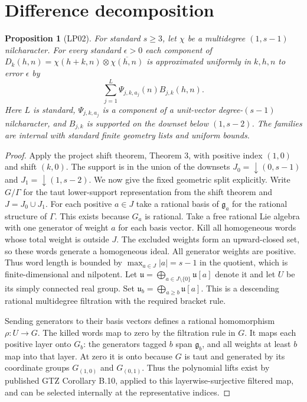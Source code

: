 \documentclass[11pt]{article}
\newtheorem{proposition}{Proposition}
\begin{document}
\section{Difference decomposition}
\begin{proposition}[LP02]
For standard $s\ge3$, let $\chi$ be a multidegree $(1,s-1)$
nilcharacter. For every standard $\epsilon>0$ each component of
$D_k(h,n)=\chi(h+k,n)\otimes\overline{\chi(h,n)}$
is approximated uniformly in $k,h,n$ to error $\epsilon$ by
\[
 \sum_{j=1}^{L} \Psi_{j,k,a_j}(n) B_{j,k}(h,n).
\]
Here $L$ is standard, $\Psi_{j,k,a_j}$ is a component of a
unit-vector degree-$(s-1)$ nilcharacter, and $B_{j,k}$ is supported
on the downset below $(1,s-2)$. The families are internal with
standard finite geometry lists and uniform bounds.
\end{proposition}
\begin{proof}
Apply the project shift theorem, Theorem 3, with positive index
$(1,0)$ and shift $(k,0)$. The support is in the union of the downsets
$J_0=\downarrow(0,s-1)$ and $J_1=\downarrow(1,s-2)$.
We now give the fixed geometric split explicitly. Write $G/\Gamma$
for the taut lower-support representation from the shift theorem and
$J=J_0\cup J_1$. For each positive $a\in J$ take a rational basis of
$\mathfrak g_a$ for the rational structure of $\Gamma$. This exists
because $G_a$ is rational. Take a free rational Lie algebra with one
generator of weight $a$ for each basis vector. Kill all homogeneous
words whose total weight is outside $J$. The excluded weights form
an upward-closed set, so these words generate a homogeneous ideal.
All generator weights are positive. Thus word length is bounded by
$\max_{a\in J}|a|=s-1$ in the quotient, which is finite-dimensional
and nilpotent. Let $\mathfrak u=\bigoplus_{a\in J\setminus\{0\}}
\mathfrak u[a]$ denote it and let $U$ be its simply connected real
group. Set $\mathfrak u_b=\bigoplus_{a\ge b}\mathfrak u[a]$.
This is a descending rational multidegree filtration with the
required bracket rule.

Sending generators to their basis vectors defines a rational
homomorphism $\rho:U\to G$. The killed words map to zero by the
filtration rule in $G$. It maps each positive layer onto $G_b$:
the generators tagged $b$ span $\mathfrak g_b$, and all weights
at least $b$ map into that layer. At zero it is onto because
$G$ is taut and generated by its coordinate groups $G_{(1,0)}$ and $G_{(0,1)}$.
Thus the polynomial lifts exist by published GTZ Corollary B.10,
applied to this layerwise-surjective filtered map, and can be
selected internally at the representative indices.


\end{proof}
\end{document}
